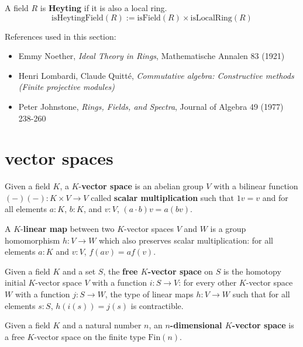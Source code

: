 \begin{definition}
A field $R$ is \textbf{Heyting} if it is also a local ring. 
$$\mathrm{isHeytingField}(R) := \mathrm{isField}(R) \times \mathrm{isLocalRing}(R)$$ 
\end{definition}

References used in this section: 
\begin{itemize}
\item Emmy Noether, \textit{Ideal Theory in Rings}, Mathematische Annalen 83 (1921)
\item Henri Lombardi, Claude Quitté, \textit{Commutative algebra: Constructive methods (Finite projective modules)}
\item Peter Johnstone, \textit{Rings, Fields, and Spectra}, Journal of Algebra 49 (1977) 238-260
\end{itemize}

\section{vector spaces}

\begin{definition}
Given a field $K$, a $K$-\textbf{vector space} is an abelian group $V$ with a bilinear function $(-)(-):K \times V \to V$ called \textbf{scalar multiplication} such that $1 v = v$ and for all elements $a:K$, $b:K$, and $v:V$, $(a \cdot b) v = a (b v)$. 
\end{definition}

\begin{definition}
A $K$-\textbf{linear map} between two $K$-vector spaces $V$ and $W$ is a group homomorphism $h:V \to W$ which also preserves scalar multiplication: for all elements $a:K$ and $v:V$, $f(a v) = a f(v)$. 
\end{definition}

\begin{definition}
Given a field $K$ and a set $S$, the \textbf{free $K$-vector space} on $S$ is the homotopy initial $K$-vector space $V$ with a function $i:S \to V$: for every other $K$-vector space $W$ with a function $j:S \to W$, the type of linear maps $h:V \to W$ such that for all elements $s:S$, $h(i(s)) = j(s)$ is contractible. 
\end{definition}

\begin{definition}
Given a field $K$ and a natural number $n$, an \textbf{$n$-dimensional $K$-vector space} is a free $K$-vector space on the finite type $\mathrm{Fin}(n)$. 
\end{definition}

